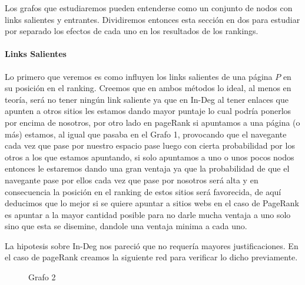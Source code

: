 Los grafos que estudiaremos pueden entenderse como un conjunto de nodos con links salientes y entrantes. Dividiremos entonces esta sección en dos para estudiar por separado los efectos de cada uno en los resultados de los rankings.

\paragraph{Links Salientes}
 Lo primero que veremos es como influyen los links salientes de una página $P$ en su posición en el ranking. Creemos que en ambos métodos lo ideal, al menos en teoría, será no tener ningún link saliente ya que en In-Deg al tener enlaces que apunten a otros sitios les estamos dando mayor puntaje lo cual podría ponerlos por encima de nosotros, por otro lado en pageRank si apuntamos a una página (o más) estamos, al igual que pasaba en el Grafo 1, provocando que el navegante cada vez que pase por nuestro espacio pase luego con cierta probabilidad por los otros a los que estamos apuntando, si solo apuntamos a uno o unos pocos nodos entonces le estaremos dando una gran ventaja ya que la probabilidad de que el navegante pase por ellos cada vez que pase por nosotros será alta y en consecuencia la posición en el ranking de estos sitios será favorecida, de aquí deducimos que lo mejor si se quiere apuntar a sitios webs en el caso de PageRank es apuntar a la mayor cantidad posible para no darle mucha ventaja a uno solo sino que esta se disemine, dandole una ventaja minima a cada uno.

La hipotesis sobre In-Deg nos pareció que no requería mayores justificaciones. En el caso de pageRank creamos la siguiente red para verificar lo dicho previamente.

\begin{figure}[H]
\centering
{}
  \caption{\footnotesize{ Grafo 2 }}
  \label{fig:Rankings}
\end{figure}

